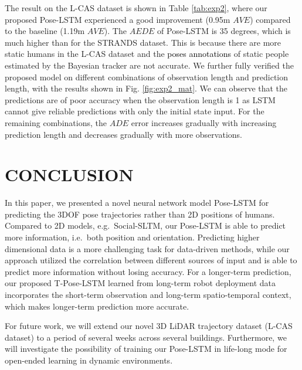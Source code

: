 \documentclass[letterpaper, 10 pt, conference]{ieeeconf}  %
\newcommand\kevinupdate[1]{\textcolor{black}{#1}}
\begin{document}
The result on the L-CAS dataset is shown in Table \ref{tab:exp2}, where our proposed Pose-LSTM experienced a good improvement (0.95m $AVE$) compared to the baseline (1.19m $AVE$). The $AEDE$ of Pose-LSTM is 35 degrees, which is much higher than for the STRANDS dataset. This is because there are more static humans in the L-CAS dataset and the \kevinupdate{poses annotations} of static people estimated by the Bayesian tracker are not accurate. We further fully verified the proposed model on different combinations of observation length and prediction length, with the results shown in Fig. \ref{fig:exp2_mat}. We can observe that the predictions are of poor accuracy when the observation length is 1 as LSTM cannot give reliable predictions with only the initial state input. For the remaining combinations, the $ADE$ error increases gradually with increasing prediction length and decreases gradually with more observations.

\section{CONCLUSION}\label{sec:conclusion}
In this paper, we presented a novel neural network model Pose-LSTM for predicting the 3DOF pose trajectories rather than 2D positions of humans. Compared to 2D models, e.g.\ Social-SLTM, our Pose-LSTM is able to predict more information, i.e.\ both position and orientation. Predicting higher dimensional data is a more challenging task for data-driven methods, while our approach utilized the correlation between different sources of input and is able to predict more information without losing accuracy. For a longer-term prediction, our proposed T-Pose-LSTM learned from long-term robot deployment data incorporates the short-term observation and long-term spatio-temporal context, which makes longer-term prediction more accurate.

For future work, we will extend our novel 3D LiDAR trajectory dataset (L-CAS dataset) to a period of several weeks across several buildings. Furthermore, we will investigate the possibility of training our Pose-LSTM in life-long mode for open-ended learning in dynamic environments. 

\end{document}
